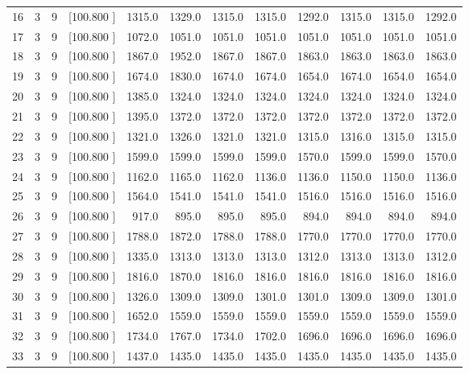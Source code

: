 \documentclass[12pt,a4paper]{article}
\begin{document}
\begin{center}
{\begin{tabular}{r r r r r r r r r r r r}
  16&  3&  9&[100.800   ]&  1315.0&  1329.0&  1315.0&  1315.0&  1292.0&  1315.0&  1315.0&  1292.0\\[-0.02in]
  17&  3&  9&[100.800   ]&  1072.0&  1051.0&  1051.0&  1051.0&  1051.0&  1051.0&  1051.0&  1051.0\\[-0.02in]
  18&  3&  9&[100.800   ]&  1867.0&  1952.0&  1867.0&  1867.0&  1863.0&  1863.0&  1863.0&  1863.0\\[-0.02in]
  19&  3&  9&[100.800   ]&  1674.0&  1830.0&  1674.0&  1674.0&  1654.0&  1674.0&  1654.0&  1654.0\\[-0.02in]
  20&  3&  9&[100.800   ]&  1385.0&  1324.0&  1324.0&  1324.0&  1324.0&  1324.0&  1324.0&  1324.0\\[-0.02in]
  21&  3&  9&[100.800   ]&  1395.0&  1372.0&  1372.0&  1372.0&  1372.0&  1372.0&  1372.0&  1372.0\\[-0.02in]
  22&  3&  9&[100.800   ]&  1321.0&  1326.0&  1321.0&  1321.0&  1315.0&  1316.0&  1315.0&  1315.0\\[-0.02in]
  23&  3&  9&[100.800   ]&  1599.0&  1599.0&  1599.0&  1599.0&  1570.0&  1599.0&  1599.0&  1570.0\\[-0.02in]
  24&  3&  9&[100.800   ]&  1162.0&  1165.0&  1162.0&  1136.0&  1136.0&  1150.0&  1150.0&  1136.0\\[-0.02in]
  25&  3&  9&[100.800   ]&  1564.0&  1541.0&  1541.0&  1541.0&  1516.0&  1516.0&  1516.0&  1516.0\\[-0.02in]
  26&  3&  9&[100.800   ]&   917.0&   895.0&   895.0&   895.0&   894.0&   894.0&   894.0&   894.0\\[-0.02in]
  27&  3&  9&[100.800   ]&  1788.0&  1872.0&  1788.0&  1788.0&  1770.0&  1770.0&  1770.0&  1770.0\\[-0.02in]
  28&  3&  9&[100.800   ]&  1335.0&  1313.0&  1313.0&  1313.0&  1312.0&  1313.0&  1313.0&  1312.0\\[-0.02in]
  29&  3&  9&[100.800   ]&  1816.0&  1870.0&  1816.0&  1816.0&  1816.0&  1816.0&  1816.0&  1816.0\\[-0.02in]
  30&  3&  9&[100.800   ]&  1326.0&  1309.0&  1309.0&  1301.0&  1301.0&  1309.0&  1309.0&  1301.0\\[-0.02in]
  31&  3&  9&[100.800   ]&  1652.0&  1559.0&  1559.0&  1559.0&  1559.0&  1559.0&  1559.0&  1559.0\\[-0.02in]
  32&  3&  9&[100.800   ]&  1734.0&  1767.0&  1734.0&  1702.0&  1696.0&  1696.0&  1696.0&  1696.0\\[-0.02in]
  33&  3&  9&[100.800   ]&  1437.0&  1435.0&  1435.0&  1435.0&  1435.0&  1435.0&  1435.0&  1435.0\\[-0.02in]

\end{tabular}}
\end{center}
\end{document}
